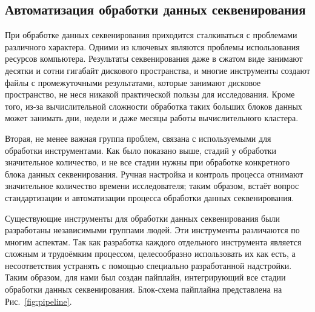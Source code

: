 \documentclass[a4paper,14pt]{extarticle}
\newcommand{\picref}[1]{Рис.~\ref{#1}}
\begin{document}
\subsection{Автоматизация обработки данных секвенирования}

При обработке данных секвенирования приходится сталкиваться с проблемами различного характера.
Одними из ключевых являются проблемы использования ресурсов компьютера.
Результаты секвенирования даже в сжатом виде занимают десятки и сотни гигабайт дискового пространства, и многие инструменты создают файлы с промежуточными результатами, которые занимают дисковое пространство, не неся никакой практической пользы для исследования.
Кроме того, из-за вычислительной сложности обработка таких больших блоков данных может занимать дни, недели и даже месяцы работы вычислительного кластера.

Вторая, не менее важная группа проблем, связана с используемыми для обработки инструментами.
Как было показано выше, стадий у обработки значительное количество, и не все стадии нужны при обработке конкретного блока данных секвенирования.
Ручная настройка и контроль процесса отнимают значительное количество времени исследователя;
таким образом, встаёт вопрос стандартизации и автоматизации процесса обработки данных секвенирования.

Существующие инструменты для обработки данных секвенирования были разработаны независимыми группами людей.
Эти инструменты различаются по многим аспектам.
% 
%
Так как разработка каждого отдельного инструмента является сложным и трудоёмким процессом, целесообразно использовать их как есть, а несоответствия устранять с помощью специально разработанной надстройки.
Таким образом, для нами был создан пайплайн, интегрирующий все стадии обработки данных секвенирования.
Блок-схема пайплайна представлена на \picref{fig:pipeline}.
\end{document}
